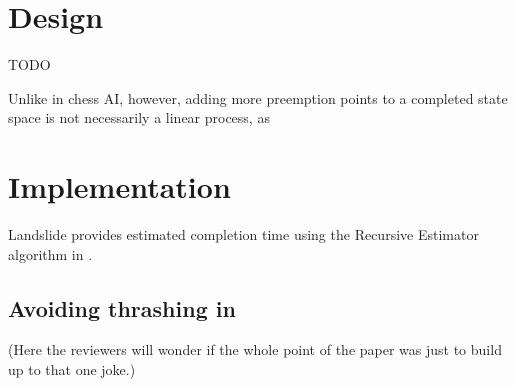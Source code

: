 \section{Design}

TODO

Unlike in chess AI, however, adding more preemption points to a completed state space is not necessarily a linear process, as  %



\section{Implementation}

Landslide provides estimated completion time using the Recursive Estimator algorithm in \cite{estimation}.


\subsection{Avoiding thrashing in \quicksand}

(Here the reviewers will wonder if the whole point of the paper was just to build up to that one joke.)
